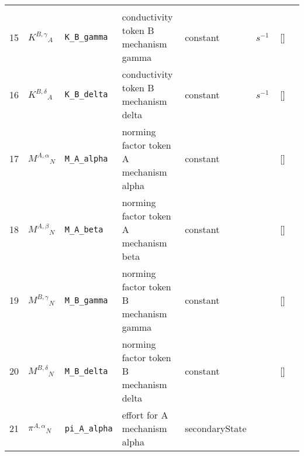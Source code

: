\begin{longtable}{|p{1cm}|p{3cm}|p{3cm}|p{7cm}|p{3.0cm}|p{3cm}|p{2cm}|p{1cm}|}
             & \\
    15
             & \hypertarget{"v:15"}{ $ {{K^{B,\gamma}}}{_{A}} $}
             & \verb|K_B_gamma|
             & conductivity token B mechanism gamma
             & \begin{lay}constant \end{lay}
             & $ s^{-1} \, $
             & []
             & \\
    16
             & \hypertarget{"v:16"}{ $ {{K^{B,\delta}}}{_{A}} $}
             & \verb|K_B_delta|
             & conductivity token B mechanism delta
             & \begin{lay}constant \end{lay}
             & $ s^{-1} \, $
             & []
             & \\
    17
             & \hypertarget{"v:17"}{ $ {{M^{A,\alpha}}}{_{N}} $}
             & \verb|M_A_alpha|
             & norming factor token A mechanism alpha
             & \begin{lay}constant \end{lay}
             & $  $
             & []
             & \\
    18
             & \hypertarget{"v:18"}{ $ {{M^{A,\beta}}}{_{N}} $}
             & \verb|M_A_beta|
             & norming factor token A mechanism beta
             & \begin{lay}constant \end{lay}
             & $  $
             & []
             & \\
    19
             & \hypertarget{"v:19"}{ $ {{M^{B,\gamma}}}{_{N}} $}
             & \verb|M_B_gamma|
             & norming factor token B mechanism gamma
             & \begin{lay}constant \end{lay}
             & $  $
             & []
             & \\
    20
             & \hypertarget{"v:20"}{ $ {{M^{B,\delta}}}{_{N}} $}
             & \verb|M_B_delta|
             & norming factor token B mechanism delta
             & \begin{lay}constant \end{lay}
             & $  $
             & []
             & \\
    21
             & \hypertarget{"v:21"}{ $ {{\pi^{A,\alpha}}}{_{N}} $}
             & \verb|pi_A_alpha|
             & effort for A mechanism alpha
             & \begin{lay}secondaryState \end{lay}

\end{longtable}
